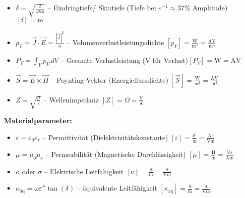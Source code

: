 \begin{itemize}
\item $\delta = \sqrt{\frac{2}{\omega\kappa\mu}}$ -- Eindringtiefe/ Skintiefe (Tiefe bei $e^{-1} \approx 37\%$ Amplitude) \hfill $[\delta] = \text{m}$
\item $p_V = \vec{J} \cdot \vec{E} = \frac{|\vec{J}|^2}{\kappa}$ -- Volumenverlustleistungsdichte \hfill $[p_V] = \frac{\text{W}}{\text{m}^3} = \frac{\text{A} \text{V}}{\text{m}^3} $
\item $P_V = \int_V p_V \, dV$ -- Gesamte Verlustleistung (V für Verlust)\hfill $[P_V] = \text{W} = \text{A}\text{V}$
\item $\vec{S} = \vec{E} \times \vec{H}$ -- Poynting-Vektor (Energieflussdichte) \hfill $[\vec{S}] = \frac{\text{W}}{\text{m}^2}= \frac{\text{A} \text{V}}{\text{m}^2} $
\item $Z = \sqrt{\frac{\mu}{\varepsilon}}$ -- Wellenimpedanz \hfill $[Z] = \Omega = \frac{\text{V}}{\text{A}}$
\end{itemize}


\textbf{Materialparameter:}
\begin{itemize}
\item $\varepsilon = \varepsilon_0 \varepsilon_r$ -- Permittivität (Dielektrizitätskonstante) \hfill $[\varepsilon] = \frac{\text{F}}{\text{m}} = \frac{\text{As}}{\text{Vm}}$
\item $\mu = \mu_0 \mu_r$ -- Permeabilität (Magnetische Durchlässigkeit) \hfill $[\mu] = \frac{\text{H}}{\text{m}} = \frac{\text{Vs}}{\text{Am}}$
\item $\kappa$ oder $\sigma$ -- Elektrische Leitfähigkeit \hfill $[\kappa] = \frac{\text{S}}{\text{m}} = \frac{\text{A}}{\text{Vm}}$
\item $\kappa_{\text{äq}} = \omega\varepsilon''\tan(\delta)$ -- äquivalente Leitfähigkeit \hfill $[\kappa_{\text{äq}}] = \frac{\text{S}}{\text{m}} = \frac{\text{A}}{\text{Vm}}$
\end{itemize}


